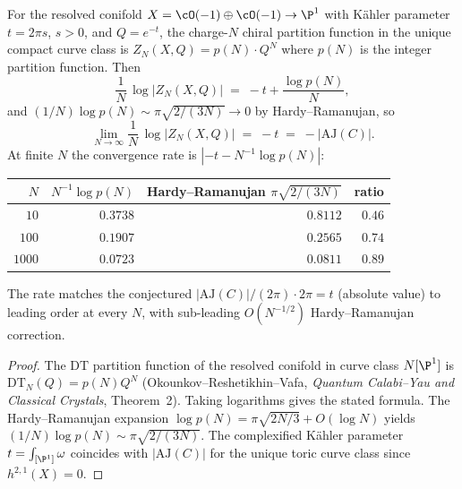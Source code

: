 \begin{proposition}
\label{prop:chiral-volume-small-N-conifold}
For the resolved conifold $X = \cO(-1) \oplus \cO(-1) \to \P^1$ with K\"ahler parameter $t = 2\pi s$, $s > 0$, and $Q = e^{-t}$, the charge-$N$ chiral partition function in the unique compact curve class is $Z_N(X, Q) = p(N) \cdot Q^N$ where $p(N)$ is the integer partition function. Then
\[
 \frac{1}{N}\,\log\bigl\lvert Z_N(X, Q) \bigr\rvert \;=\; -t + \frac{\log p(N)}{N},
\]
and $(1/N) \log p(N) \sim \pi \sqrt{2/(3N)} \to 0$ by Hardy--Ramanujan, so
\[
 \lim_{N \to \infty} \frac{1}{N}\,\log\bigl\lvert Z_N(X, Q) \bigr\rvert \;=\; -t \;=\; -\bigl\lvert \mathrm{AJ}(C) \bigr\rvert.
\]
At finite $N$ the convergence rate is $|{-}t - N^{-1}\log p(N)|$:
\begin{center}
\small\renewcommand{\arraystretch}{1.1}
\begin{tabular}{rrrr}
\toprule
$N$ & $N^{-1} \log p(N)$ & Hardy--Ramanujan $\pi\sqrt{2/(3N)}$ & ratio \\
\midrule
$10$ & $0.3738$ & $0.8112$ & $0.46$ \\
$100$ & $0.1907$ & $0.2565$ & $0.74$ \\
$1000$ & $0.0723$ & $0.0811$ & $0.89$ \\
\bottomrule
\end{tabular}
\end{center}
The rate matches the conjectured $|\mathrm{AJ}(C)|/(2\pi) \cdot 2\pi = t$ (absolute value) to leading order at every $N$, with sub-leading $O(N^{-1/2})$ Hardy--Ramanujan correction.
\end{proposition}

\begin{proof}
The $\mathrm{DT}$ partition function of the resolved conifold in curve class $N[\P^1]$ is $\mathrm{DT}_N(Q) = p(N) Q^N$ (Okounkov--Reshetikhin--Vafa, \emph{Quantum Calabi--Yau and Classical Crystals}, Theorem~2). Taking logarithms gives the stated formula. The Hardy--Ramanujan expansion $\log p(N) = \pi \sqrt{2N/3} + O(\log N)$ yields $(1/N) \log p(N) \sim \pi \sqrt{2/(3N)}$. The complexified K\"ahler parameter $t = \int_{[\P^1]} \omega$ coincides with $|\mathrm{AJ}(C)|$ for the unique toric curve class since $h^{2,1}(X) = 0$.
\end{proof}

